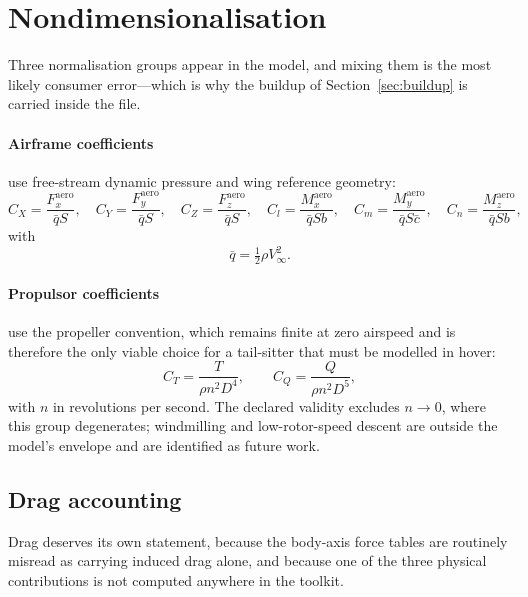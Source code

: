 \documentclass[11pt,a4paper]{article}
\begin{document}
\section{Nondimensionalisation}
\label{sec:nondim}

Three normalisation groups appear in the model, and mixing them is the
most likely consumer error---which is why the buildup of
Section~\ref{sec:buildup} is carried inside the file.

\paragraph{Airframe coefficients} use free-stream dynamic pressure and
wing reference geometry:
\begin{equation}
C_X = \frac{F_x^{\mathrm{aero}}}{\bar q S}, \quad
C_Y = \frac{F_y^{\mathrm{aero}}}{\bar q S}, \quad
C_Z = \frac{F_z^{\mathrm{aero}}}{\bar q S}, \quad
C_l = \frac{M_x^{\mathrm{aero}}}{\bar q S b}, \quad
C_m = \frac{M_y^{\mathrm{aero}}}{\bar q S \bar c}, \quad
C_n = \frac{M_z^{\mathrm{aero}}}{\bar q S b},
\end{equation}
with
\begin{equation}
\bar q = \tfrac{1}{2}\rho V_\infty^2 .
\end{equation}

\paragraph{Propulsor coefficients} use the propeller convention, which
remains finite at zero airspeed and is therefore the only viable choice
for a tail-sitter that must be modelled in hover:
\begin{equation}
C_T = \frac{T}{\rho n^2 D^4}, \qquad
C_Q = \frac{Q}{\rho n^2 D^5},
\label{eq:propnorm}
\end{equation}
with $n$ in revolutions per second. The declared validity excludes
$n \to 0$, where this group degenerates; windmilling and
low-rotor-speed descent are outside the model's envelope and are
identified as future work.

\subsection{Drag accounting}
\label{sec:drag}

Drag deserves its own statement, because the body-axis force tables are
routinely misread as carrying induced drag alone, and because one of the
three physical contributions is not computed anywhere in the toolkit.
\end{document}
